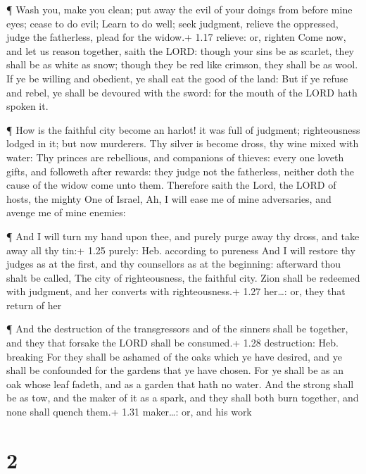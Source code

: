 ¶ Wash you, make you clean; put away the evil of your
doings from before mine eyes; cease to do evil;  Learn to
do well; seek judgment, relieve the oppressed, judge the fatherless,
plead for the widow.+ 1.17 relieve: or, righten  Come now,
and let us reason together, saith the LORD: though your sins be as
scarlet, they shall be as white as snow; though they be red like
crimson, they shall be as wool.  If ye be willing and
obedient, ye shall eat the good of the land:  But if ye
refuse and rebel, ye shall be devoured with the sword: for the mouth of
the LORD hath spoken it.

 ¶ How is the faithful city become an harlot! it was full
of judgment; righteousness lodged in it; but now murderers.
 Thy silver is become dross, thy wine mixed with water:
 Thy princes are rebellious, and companions of thieves:
every one loveth gifts, and followeth after rewards: they judge not the
fatherless, neither doth the cause of the widow come unto them.
 Therefore saith the Lord, the LORD of hosts, the mighty
One of Israel, Ah, I will ease me of mine adversaries, and avenge me of
mine enemies:

 ¶ And I will turn my hand upon thee, and purely purge away
thy dross, and take away all thy tin:+ 1.25 purely: Heb. according to
pureness  And I will restore thy judges as at the first,
and thy counsellors as at the beginning: afterward thou shalt be called,
The city of righteousness, the faithful city.  Zion shall
be redeemed with judgment, and her converts with righteousness.+ 1.27
her\ldots: or, they that return of her

 ¶ And the destruction of the transgressors and of the
sinners shall be together, and they that forsake the LORD shall be
consumed.+ 1.28 destruction: Heb. breaking  For they shall
be ashamed of the oaks which ye have desired, and ye shall be confounded
for the gardens that ye have chosen.  For ye shall be as an
oak whose leaf fadeth, and as a garden that hath no water. 
And the strong shall be as tow, and the maker of it as a spark, and they
shall both burn together, and none shall quench them.+ 1.31 maker\ldots:
or, and his work

\hypertarget{section-1}{%
\section{2}\label{section-1}}

